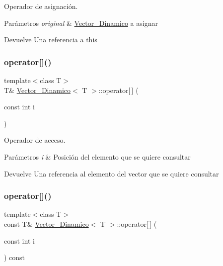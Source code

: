 Operador de asignación. 


\begin{DoxyParams}{Parámetros}
{\em original} & \mbox{\hyperlink{classVector__Dinamico}{Vector\+\_\+\+Dinamico}} a asignar \\
\hline
\end{DoxyParams}
\begin{DoxyReturn}{Devuelve}
Una referencia a this 
\end{DoxyReturn}
\mbox{\label{classVector__Dinamico_a93666466d9a2bf8bc4f2a217d5f94bf9}} 
\subsubsection{\texorpdfstring{operator[]()}{operator[]()}\hspace{0.1cm}{\footnotesize\ttfamily [1/2]}}
{\footnotesize\ttfamily template$<$class T$>$ \\
T\& \mbox{\hyperlink{classVector__Dinamico}{Vector\+\_\+\+Dinamico}}$<$ T $>$\+::operator\mbox{[}$\,$\mbox{]} (\begin{DoxyParamCaption}\item[{const int}]{i }\end{DoxyParamCaption})}



Operador de acceso. 


\begin{DoxyParams}{Parámetros}
{\em i} & Posición del elemento que se quiere consultar \\
\hline
\end{DoxyParams}
\begin{DoxyReturn}{Devuelve}
Una referencia al elemento del vector que se quiere consultar 
\end{DoxyReturn}
\mbox{\label{classVector__Dinamico_a3129decf0d63405ced07ded86d5b05f3}} 
\subsubsection{\texorpdfstring{operator[]()}{operator[]()}\hspace{0.1cm}{\footnotesize\ttfamily [2/2]}}
{\footnotesize\ttfamily template$<$class T$>$ \\
const T\& \mbox{\hyperlink{classVector__Dinamico}{Vector\+\_\+\+Dinamico}}$<$ T $>$\+::operator\mbox{[}$\,$\mbox{]} (\begin{DoxyParamCaption}\item[{const int}]{i }\end{DoxyParamCaption}) const}



